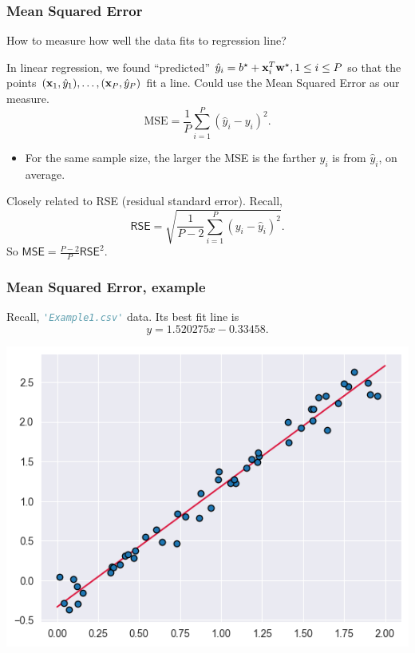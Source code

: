 \documentclass{beamer}
\theoremstyle{example}
\newcommand{\ct}[1]{\lstinline[language=Python]!#1!}
\begin{document}
\begin{frame}
\frametitle{Mean Squared Error}
How to measure how well the data fits to regression line?

\pause 
In linear regression, we found ``predicted'' $\hat{y}_i = b^\star + {\bf x}_i^T{\bf w}^\star, 1\le i\le P$ so that the points $({\bf x}_1,\hat{y}_1), \ldots, ({\bf x}_P, \hat{y}_P)$ fit a line. Could use the Mean Squared Error as our measure.
    \[ \text{MSE} = \frac{1}{P}\sum_{i=1}^P (\hat{y}_i-y_i)^2. \]
\pause
\begin{itemize}
    \item For the same sample size, the larger the MSE is the farther $y_i$ is from $\hat{y}_i$, on average.
\end{itemize}

\pause
Closely related to RSE (residual standard error). Recall, 
    \[\textsf{RSE} = \sqrt{\frac{1}{P-2}\sum_{i=1}^P(y_i - \hat{y}_i)^2}.\]
So $\textsf{MSE} = \frac{P-2}{P}\textsf{RSE}^2$.
\end{frame}

\begin{frame}
    \frametitle{Mean Squared Error, example}
    Recall, \ct{'Example1.csv'} data. Its best fit line is 
        \[y = 1.520275x - 0.33458.\]

    \vfill
    \centering
    \includegraphics[height=0.35\textheight]{../../Images/example1-lsrline.png}
\end{frame}
\end{document}
